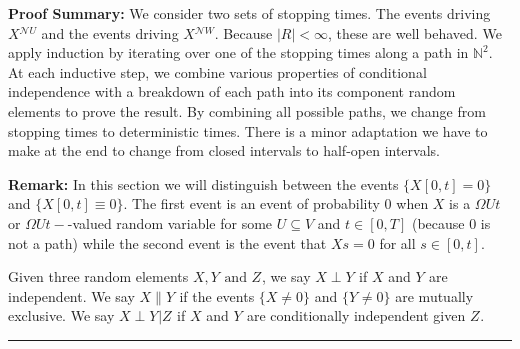 \documentclass[12pt]{article}
\newcommand{\skipLine}{\vspace{12pt}}
\newcommand{\mb}{\mathbb}
\newcommand{\mc}{\mathcal}
\newcommand{\te}{\text}
\newcommand{\pfsum}{\textbf{Proof Summary: }}
\newcommand{\ind}{\hspace{24pt}}
\newcommand{\lin}{\rule{\linewidth}{0.4 pt}}
\newcommand{\neigh}{\mc{N}}					%
\renewcommand{\U}{U}							%
\newcommand{\UU}{W}								%
\newcommand{\UUU}{R}							%
\newcommand{\T}{T}								%
\renewcommand{\t}{t}							%
\renewcommand{\tt}{s}							%
\newcommand{\X}{X}								%
\newcommand{\V}{V}									%
\newcommand{\rxvtts}[2]{Y_{#1}{#2}}					%
\newcommand{\rxvttts}[2]{Z_{#1}{#2}}				%
\newcommand{\mutex}{\|}								%
\begin{document}
\pfsum We consider two sets of stopping times. The events driving \(\X{}{}^{\neigh{\U}}\) and the events driving \(\X{}{}^{\neigh{\UU}}\). Because \(|\UUU| < \infty\), these are well behaved. We apply induction by iterating over one of the stopping times along a path in \(\mb{N}^2\). At each inductive step, we combine various properties of conditional independence with a breakdown of each path into its component random elements to prove the result. By combining all possible paths, we change from stopping times to deterministic times. There is a minor adaptation we have to make at the end to change from closed intervals to half-open intervals.

\skipLine

\textbf{Remark:} In this section we will distinguish between the events \(\{\X{}{[0,\t]} = 0\}\) and \(\{\X{}{[0,\t]}\equiv 0\}\). The first event is an event of probability 0 when \(\X{}{}\) is a \(\Omega{\U}{\t}\) or \(\Omega{\U}{\t-}\)-valued random variable for some \(\U\subseteq \V\) and \(\t \in [0,\T]\) (because 0 is not a path) while the second event is the event that \(\X{}{\tt} = 0\) for all \(\tt \in [0,\t]\).

\ind Given three random elements \(\X{}{},\rxvtts{}{} \te{ and } \rxvttts{}{}\), we say \(\X{}{}\perp \rxvtts{}{}\) if \(\X{}{}\) and \(\rxvtts{}{}\) are independent. We say \(\X{}{}\mutex \rxvtts{}{}\) if the events \(\{\X{}{}\neq 0\}\) and \(\{\rxvtts{}{} \neq 0\}\) are mutually exclusive. We say \(\X{}{}\perp \rxvtts{}{}|\rxvttts{}{}\) if \(\X{}{}\) and \(\rxvtts{}{}\) are conditionally independent given \(\rxvttts{}{}\).

\lin
\end{document}
